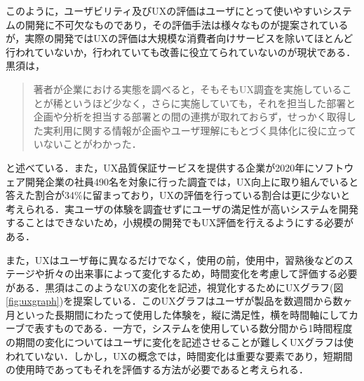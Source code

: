このように，ユーザビリティ及びUXの評価はユーザにとって使いやすいシステムの開発に不可欠なものであり，その評価手法は様々なものが提案されているが，実際の開発ではUXの評価は大規模な消費者向けサービスを除いてほとんど行われていないか，行われていても改善に役立てられていないのが現状である．黒須は，\begin{quotation}
  著者が企業における実態を調べると，そもそもUX調査を実施していることが稀というほど少なく，さらに実施していても，それを担当した部署と企画や分析を担当する部署との間の連携が取れておらず，せっかく取得した実利用に関する情報が企画やユーザ理解にもとづく具体化に役に立っていないことがわかった\cite{kurosu}．
\end{quotation}と述べている．また，UX品質保証サービスを提供する企業が2020年にソフトウェア開発企業の社員490名を対象に行った調査\cite{shift}では，UX向上に取り組んでいると答えた割合が34\%に留まっており，UXの評価を行っている割合は更に少ないと考えられる．実ユーザの体験を調査せずにユーザの満足性が高いシステムを開発することはできないため，小規模の開発でもUX評価を行えるようにする必要がある．

また，UXはユーザ毎に異なるだけでなく，使用の前，使用中，習熟後などのステージや折々の出来事によって変化するため，時間変化を考慮して評価する必要がある\cite{kurosu}．黒須はこのようなUXの変化を記述，視覚化するためにUXグラフ\cite{kurosu2015}(図\ref{fig:uxgraph})を提案している．このUXグラフはユーザが製品を数週間から数ヶ月といった長期間にわたって使用した体験を，縦に満足性，横を時間軸にしてカーブで表すものである．一方で，システムを使用している数分間から1時間程度の期間の変化についてはユーザに変化を記述させることが難しくUXグラフは使われていない．しかし，UXの概念では，時間変化は重要な要素であり，短期間の使用時であってもそれを評価する方法が必要であると考えられる．


